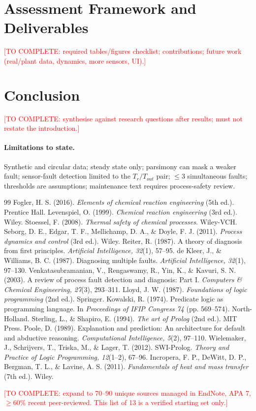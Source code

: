 \documentclass[11pt,a4paper]{article}
\newcommand{\TODO}[1]{\textcolor{red}{[TO COMPLETE: #1]}}
\begin{document}
\section{Assessment Framework and Deliverables}
\TODO{required tables/figures checklist; contributions; future work (real/plant data, dynamics, more sensors, UI).}

\section{Conclusion}
\TODO{synthesise against research questions after results; must not restate the introduction.}\label{sec:lim}
\paragraph{Limitations to state.} Synthetic and circular data; steady state only; parsimony can mask a weaker fault; sensor-fault detection limited to the $T_r/T_{out}$ pair; $\le3$ simultaneous faults; thresholds are assumptions; maintenance text requires process-safety review.

\begin{thebibliography}{99}\small
{}Fogler, H. S. (2016). \emph{Elements of chemical reaction engineering} (5th ed.). Prentice Hall.
Levenspiel, O. (1999). \emph{Chemical reaction engineering} (3rd ed.). Wiley.
Stoessel, F. (2008). \emph{Thermal safety of chemical processes}. Wiley-VCH.
Seborg, D. E., Edgar, T. F., Mellichamp, D. A., \& Doyle, F. J. (2011). \emph{Process dynamics and control} (3rd ed.). Wiley.
Reiter, R. (1987). A theory of diagnosis from first principles. \emph{Artificial Intelligence, 32}(1), 57--95.
de Kleer, J., \& Williams, B. C. (1987). Diagnosing multiple faults. \emph{Artificial Intelligence, 32}(1), 97--130.
Venkatasubramanian, V., Rengaswamy, R., Yin, K., \& Kavuri, S. N. (2003). A review of process fault detection and diagnosis: Part I. \emph{Computers \& Chemical Engineering, 27}(3), 293--311.
Lloyd, J. W. (1987). \emph{Foundations of logic programming} (2nd ed.). Springer.
Kowalski, R. (1974). Predicate logic as programming language. In \emph{Proceedings of IFIP Congress 74} (pp. 569--574). North-Holland.
Sterling, L., \& Shapiro, E. (1994). \emph{The art of Prolog} (2nd ed.). MIT Press.
Poole, D. (1989). Explanation and prediction: An architecture for default and abductive reasoning. \emph{Computational Intelligence, 5}(2), 97--110.
Wielemaker, J., Schrijvers, T., Triska, M., \& Lager, T. (2012). SWI-Prolog. \emph{Theory and Practice of Logic Programming, 12}(1--2), 67--96.
Incropera, F. P., DeWitt, D. P., Bergman, T. L., \& Lavine, A. S. (2011). \emph{Fundamentals of heat and mass transfer} (7th ed.). Wiley.
\end{thebibliography}
\TODO{expand to 70--90 unique sources managed in EndNote, APA 7, $\ge60\%$ recent peer-reviewed. This list of 13 is a verified starting set only.}
\end{document}
